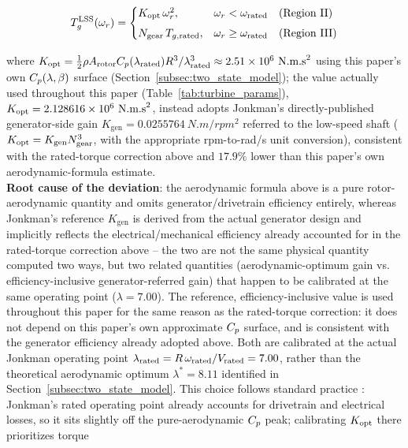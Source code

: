\begin{equation}
T_g^{\text{LSS}}(\omega_r) =
\begin{cases}
K_{\text{opt}}\,\omega_r^{2}, & \omega_r < \omega_{\text{rated}} \quad \text{(Region II)} \\[4pt]
N_{\text{gear}}\,T_{g,\text{rated}}, & \omega_r \geq \omega_{\text{rated}} \quad \text{(Region III)}
\end{cases}
\label{eq:torque_switching}
\end{equation}

where $K_{\text{opt}} = \tfrac{1}{2}\rho A_{\text{rotor}} C_p(\lambda_{\text{rated}})
R^3 / \lambda_{\text{rated}}^3 \approx 2.51\times10^{6}~\text{N.m.s}^2$ using
this paper's own $C_p(\lambda,\beta)$ surface (Section~\ref{subsec:two_state_model});
the value actually used throughout this paper
(Table~\ref{tab:turbine_params}), $K_{\text{opt}}=2.128616\times10^{6}~\text{N.m.s}^2$,
instead adopts Jonkman's directly-published generator-side gain
$K_{\text{gen}}=\SI{0.0255764}{N.m/rpm^2}$ referred to the low-speed
shaft ($K_{\text{opt}}=K_{\text{gen}}N_{\text{gear}}^3$, with the appropriate
rpm-to-rad/s unit conversion), consistent with the rated-torque
correction above and $17.9\%$ lower than this paper's own
aerodynamic-formula estimate.\\ 
\textbf{Root cause of the deviation}:
the aerodynamic formula above is a pure rotor-aerodynamic quantity
and omits generator/drivetrain efficiency entirely, whereas
Jonkman's reference $K_{\text{gen}}$ is derived from the actual
generator design and implicitly reflects the electrical/mechanical
efficiency already accounted for in the rated-torque correction
above -- the two are not the same physical quantity computed two
ways, but two related quantities (aerodynamic-optimum gain vs.
efficiency-inclusive generator-referred gain) that happen to be
calibrated at the same operating point ($\lambda=7.00$). The
reference, efficiency-inclusive value is used throughout this paper
for the same reason as the rated-torque correction: it does not
depend on this paper's own approximate $C_p$ surface, and is
consistent with the generator efficiency already adopted above. Both are
calibrated at the actual Jonkman operating point
$\lambda_{\text{rated}} = R\,\omega_{\text{rated}} / V_{\text{rated}} = 7.00$, rather
than the theoretical aerodynamic optimum $\lambda^{*} = 8.11$ identified in
Section~\ref{subsec:two_state_model}. This choice follows standard practice
\citep[e.g.][]{jonkman2009}: Jonkman's rated operating point already
accounts for drivetrain and electrical losses, so it sits slightly off the
pure-aerodynamic $C_p$ peak; calibrating $K_{\text{opt}}$ there prioritizes torque
